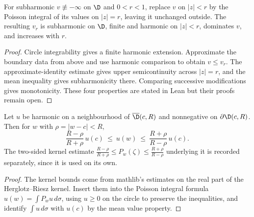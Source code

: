 \begin{theorem}
  \label{thm:I_6_5}
  \leanok
  For subharmonic $v\not\equiv-\infty$ on $\D$ and $0<r<1$, replace $v$ on $|z|<r$
  by the Poisson integral of its values on $|z|=r$, leaving it unchanged
  outside. The resulting $v_r$ is subharmonic on $\D$, finite and harmonic
  on $|z|<r$, dominates $v$, and increases with $r$.
  \begin{proof}
    \notready
    Circle integrability gives a finite harmonic extension. Approximate the
    boundary data from above and use harmonic comparison to obtain $v\le v_r$.
    The approximate-identity estimate gives upper semicontinuity across
    $|z|=r$, and the mean inequality gives subharmonicity there. Comparing
    successive modifications gives monotonicity. These four properties
    are stated in Lean but their proofs remain open.
  \end{proof}
\end{theorem}

\begin{lemma}
  \label{lem:harnack_inequality}
  \leanok
  Let $u$ be harmonic on a neighbourhood of $\overline{\D}(c,R)$ and nonnegative
  on $\partial\D(c,R)$. Then for $w$ with $\rho=|w-c|<R$,
  \[
    \frac{R-\rho}{R+\rho}\,u(c)\ \le\ u(w)\ \le\ \frac{R+\rho}{R-\rho}\,u(c).
  \]
  The two-sided kernel estimate
  $\frac{R-\rho}{R+\rho}\le P_w(\zeta)\le\frac{R+\rho}{R-\rho}$ underlying it is
  recorded separately, since it is used on its own.
  \begin{proof}
    \leanok
    The kernel bounds come from mathlib's estimates on the real part of the
    Herglotz--Riesz kernel. Insert them into the Poisson integral formula
    $u(w)=\int P_w u\,d\sigma$, using $u\ge0$ on the circle to preserve the
    inequalities, and identify $\int u\,d\sigma$ with $u(c)$ by the mean value
    property.
  \end{proof}
\end{lemma}

